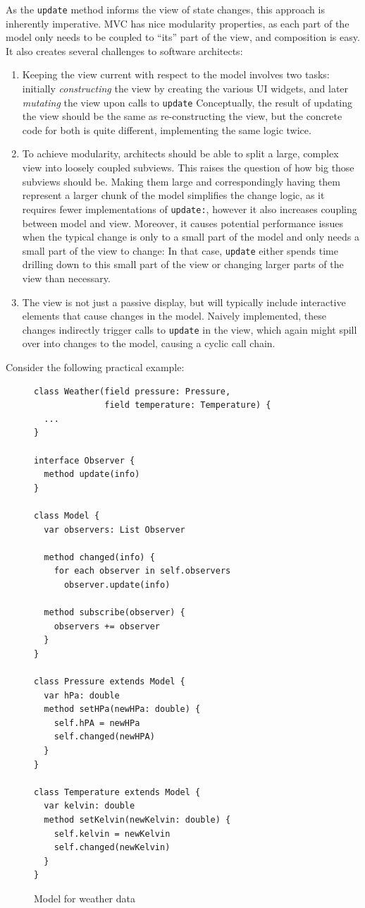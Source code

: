 \documentclass[sigplan,review,screen]{acmart}
\begin{document}
As the \texttt{update} method informs the view of state changes, this
approach is inherently imperative.  MVC has nice modularity
properties, as each part of the model only needs to be coupled to
``its'' part of the view, and composition is easy.
It also creates several challenges to
software architects:
\label{sec:challenges}
%
\begin{enumerate}
\item Keeping the view current with respect to the model involves two
  tasks: initially \emph{constructing} the view by creating the
  various UI widgets, and later \emph{mutating} the view upon calls to
  \texttt{update}  Conceptually, the result of updating the view
  should be the same as re-constructing the view, but the concrete
  code for both is quite different, implementing the same logic twice.
\item To achieve modularity, architects should be able to split a large,
  complex view into loosely coupled subviews.  This raises the
  question of how big those subviews should be. Making them large and
  correspondingly having them represent a larger chunk of the model
  simplifies the change logic, as it requires fewer implementations of
  \texttt{update:}, however it also increases coupling between model
  and view.  Moreover, it causes potential performance issues when the
  typical change is only to a small part of the model and only needs a
  small part of the view to change: In that case, \texttt{update}
  either spends time drilling down to this small part of the view or
  changing larger parts of the view than necessary.
\item The view is not just a passive display, but will typically
  include interactive elements that cause changes in the model.
  Naively implemented, these changes indirectly trigger calls to
  \texttt{update} in the view, which again might spill over into
  changes to the model, causing a cyclic call chain.
\end{enumerate}
%
Consider the following practical example:
%

\begin{figure}[tb]
\begin{verbatim}
class Weather(field pressure: Pressure,
              field temperature: Temperature) {
  ...
}

interface Observer {
  method update(info)
}

class Model {
  var observers: List Observer

  method changed(info) {
    for each observer in self.observers
      observer.update(info)

  method subscribe(observer) {
    observers += observer
  }
}

class Pressure extends Model {
  var hPa: double
  method setHPa(newHPa: double) {
    self.hPA = newHPa
    self.changed(newHPA)
  }
}

class Temperature extends Model {
  var kelvin: double
  method setKelvin(newKelvin: double) {
    self.kelvin = newKelvin
    self.changed(newKelvin)
  }
}
\end{verbatim}
  \caption{Model for weather data}
  \label{fig:weather-model}
\end{figure}
\end{document}
